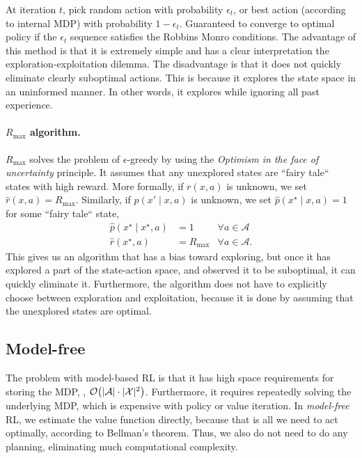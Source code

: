 At iteration $t$, pick random action with probability $\epsilon_t$, or best
action (according to internal MDP) with probability $1-\epsilon_t$. Guaranteed
to converge to optimal policy if the $\epsilon_t$ sequence satisfies the
Robbins Monro conditions. The advantage of this method is that it is extremely
simple and has a clear interpretation \wrt the exploration-exploitation
dilemma. The disadvantage is that it does not quickly eliminate clearly
suboptimal actions. This is because it explores the state space in an
uninformed manner. In other words, it explores while ignoring all past
experience.

\paragraph{$R_{\max}$ algorithm.}

$R_{\max}$ solves the problem of $\epsilon$-greedy by using the
\textit{Optimism in the face of uncertainty} principle. It assumes that any
unexplored states are ``fairy tale`` states with high reward. More formally, if
$r(x,a)$ is unknown, we set $\hat{r}(x,a)=R_{\max}$. Similarly, if $p(x'\mid
x,a)$ is unknown, we set $\hat{p}(x^\star\mid x,a)=1$ for some ``fairy tale`` state,
\begin{align*}
  \hat{p}(x^\star\mid x^\star, a) &= 1 & \forall a \in \mathcal{A} \\
  \hat{r}(x^\star, a) &= R_{\max} & \forall a \in \mathcal{A}
.\end{align*}
This gives us an algorithm that has a bias toward exploring, but once it has
explored a part of the state-action space, and observed it to be suboptimal, it
can quickly eliminate it. Furthermore, the algorithm does not have to
explicitly choose between exploration and exploitation, because it is done by
assuming that the unexplored states are optimal.

\subsection{Model-free}

The problem with model-based RL is that it has high space requirements for
storing the MDP, \ie, $\bigo{|\mathcal{A}|\cdot |\mathcal{X}|^2}$. Furthermore,
it requires repeatedly solving the underlying MDP, which is expensive with
policy or value iteration. In \textit{model-free} RL, we estimate the value
function directly, because that is all we need to act optimally, according to
Bellman's theorem. Thus, we also do not need to do any planning, eliminating
much computational complexity.

